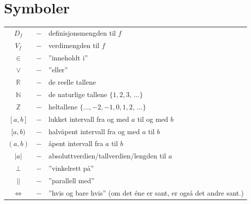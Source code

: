 


\section*{Symboler}
\renewcommand{\arraystretch}{1.2}
\begin{tabular}{@{}cp{0.4cm}l}
$ D_f $ &$ - $& definisjonsmengden til $ f $	\\
$ V_f $ & $-$ & verdimengden til $f$\\
$ \in $ &$ - $& ''inneholdt i'' \\
$ \vee $ &$ - $&''eller'' \\
$ \mathbb{R} $ &$ - $&de reelle tallene \\
$ \mathbb{N} $ &$ - $&de naturlige tallene $ \{1, 2, 3,\,...\} $ \\
$ \mathbb{Z} $ &$ - $&heltallene $ \{...,-2,-1, 0, 1, 2,\,...\} $ \\
$ [a, b] $ &$ - $& lukket intervall fra og med $ a $ til og med $ b $\\
$ [a, b) $ &$ - $& halvåpent intervall fra og med $ a $ til $ b $ \\
$ (a, b) $ &$ - $& åpent intervall fra $ a $ til $ b $ \\
$|a| $ &$ - $&  absoluttverdien/tallverdien/lengden til $ a $\\
$\perp $ &$ - $&  ''vinkelrett på'' \\
$|| $ &$ - $&  ''parallell med'' \\
$ \iff$ &$ - $& ''hvis og bare hvis'' (om det éne er sant, er også det andre sant.)
\end{tabular}
\renewcommand{\arraystretch}{1}



